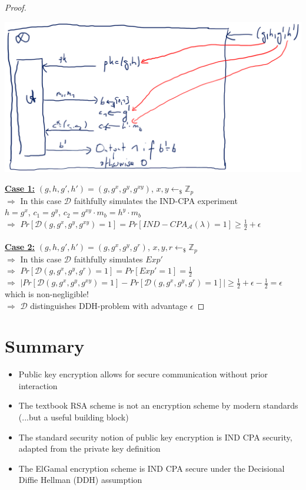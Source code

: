 \begin{proof}
\begin{center}
	\includegraphics[width=140mm]{Graphics/Public Key Encryption/pke4.png}
\end{center}
	\textbf{\underline{Case 1:}}
		$(g,h,g',h')=(g,g^x,g^y,g^{xy})$, $x,y \leftarrow_{\$} \mathbb{Z}_p$\\
		$\Rightarrow$ In this case $\mathcal{D}$ faithfully simulates the IND-CPA experiment\\
		$h=g^x$, $c_1 = g^y$, $c_2 = g^{xy} \cdot m_b = h^y \cdot m_b$\\
		$\Rightarrow$ $Pr[\mathcal{D}(g,g^x,g^y,g^{xy})=1] = Pr[IND-CPA_{\mathcal{A}}(\lambda)=1] \geq \frac{1}{2} + \epsilon$\\\\
	\textbf{\underline{Case 2:}}
		$(g,h,g',h')=(g,g^x,g^y,g^{r})$, $x,y,r \leftarrow_{\$} \mathbb{Z}_p$\\
		$\Rightarrow$ In this case $\mathcal{D}$ faithfully simulates $Exp'$\\
		$\Rightarrow$ $Pr[\mathcal{D}(g,g^x,g^y,g^{r})=1] = Pr[Exp'=1] = \frac{1}{2}$\\
		$\Rightarrow$ $|Pr[\mathcal{D}(g,g^x,g^y,g^{xy})=1]-Pr[\mathcal{D}(g,g^x,g^y,g^{r})=1]| \geq \frac{1}{2} + \epsilon - \frac{1}{2} = \epsilon$ which is non-negligible!\\
		$\Rightarrow$ $\mathcal{D}$ distinguishes DDH-problem with advantage $\epsilon$
\end{proof}

\section{Summary}
	\begin{itemize}
		\item Public key encryption allows for secure communication without prior interaction
		\item The textbook RSA scheme is not an encryption scheme by modern standards (...but a useful building block)
		\item The standard security notion of public key encryption is IND CPA security, adapted from the private key definition
		\item The ElGamal encryption scheme is IND CPA secure under the Decisional Diffie Hellman (DDH) assumption
	\end{itemize}


